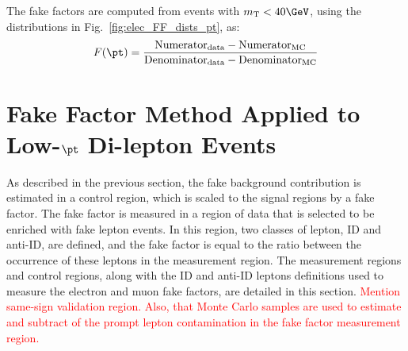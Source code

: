 The fake factors are computed from events  with $m_{\mathrm{T}}<40\GeV$, using the distributions in Fig.~\ref{fig:elec_FF_dists_pt}, as:
\begin{equation}
  F(\pt) = \frac{\mathrm{Numerator}_{\mathrm{data}} - \mathrm{Numerator}_{\mathrm{MC}}}{\mathrm{Denominator}_{\mathrm{data}} - \mathrm{Denominator}_{\mathrm{MC}}}
\end{equation}
  \FloatBarrier
  
  \section{Fake Factor Method Applied to Low-$\pt$ Di-lepton Events}
  \label{sec:FFmethod}
As described in the previous section, the fake background contribution is estimated in a control region, which is scaled to the signal regions by a fake factor.  The fake factor is measured in a region of data that is selected to be enriched with fake lepton events.  In this region, two classes of lepton, ID and anti-ID, are defined, and the fake factor is equal to the ratio between the occurrence of these leptons in the measurement region.  The measurement regions and control regions, along with the ID and anti-ID leptons definitions used to measure the electron and muon fake factors, are detailed in this section.  \textcolor{red}{Mention same-sign validation region.  Also, that Monte Carlo samples are used to estimate and subtract of the prompt lepton contamination in the fake factor measurement region.}

